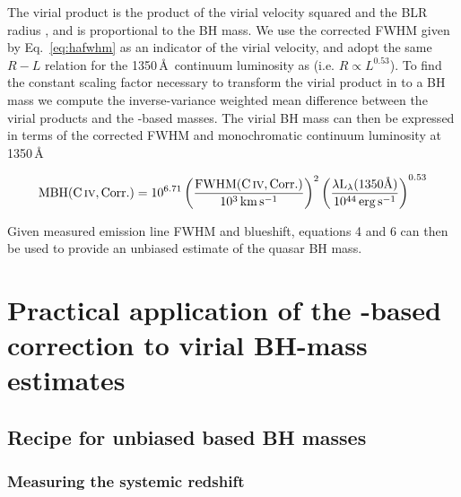 The virial product is the product of the virial velocity squared and the BLR radius \citep[e.g.][]{shen13}, and is proportional to the BH mass. 
We use the corrected  FWHM given by Eq.~\ref{eq:hafwhm} as an indicator of the virial velocity, and adopt the same $R-L$ relation for the 1350\,\AA\, continuum luminosity as \citet{vestergaard06} (i.e. $R \propto L^{0.53}$). 
To find the constant scaling factor necessary to transform the virial product in to a BH mass we compute the inverse-variance weighted mean difference between the virial products and the \hans-based masses. 
The virial BH mass can then be expressed in terms of the corrected  FWHM and monochromatic continuum luminosity at 1350\,\AA

\begin{equation}
  \label{eq:masscorrection}
  \mathrm{MBH}(\mathrm{C}\,\textsc{iv}, \mathrm{Corr.}) = 10^{6.71}\left( \frac{ \mathrm{FWHM}(\mathrm{C}\,\textsc{iv}, \mathrm{Corr.})}{10^3 \rm{\,km\,s^{-1}}} \right)^2 \left( \frac{\lambda \mathrm{L}_{\lambda} (1350 \text{\AA}) }{10^{44} \rm{\,erg\,s^{-1}}}  \right)^{0.53}
\end{equation}

Given measured  emission line FWHM and blueshift, equations 4 and 6 can then be used to provide an unbiased estimate of the quasar BH mass.

\section{Practical application of the -based correction to virial BH-mass estimates}

\subsection{Recipe for unbiased  based BH masses}
\label{sec:recipe}

\subsubsection{Measuring the systemic redshift}

